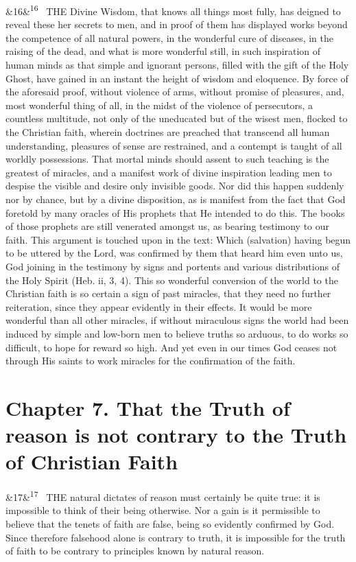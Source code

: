 \documentclass[12pt]{article}
\newcommand{\para}[1][]{\par\noindent\ifx&#1&\else\textsuperscript{\footnotesize #1}~\fi}
\begin{document}
\para[16] THE Divine Wisdom, that knows all things most fully, has deigned to reveal these her secrets to men, and in proof of them has displayed works beyond the competence of all natural powers, in the wonderful cure of diseases, in the raising of the dead, and what is more wonderful still, in such inspiration of human minds as that simple and ignorant persons, filled with the gift of the Holy Ghost, have gained in an instant the height of wisdom and eloquence. By force of the aforesaid proof, without violence of arms, without promise of pleasures, and, most wonderful thing of all, in the midst of the violence of persecutors, a countless multitude, not only of the uneducated but of the wisest men, flocked to the Christian faith, wherein doctrines are preached that transcend all human understanding, pleasures of sense are restrained, and a contempt is taught of all worldly possessions. That mortal minds should assent to such teaching is the greatest of miracles, and a manifest work of divine inspiration leading men to despise the visible and desire only invisible goods. Nor did this happen suddenly nor by chance, but by a divine disposition, as is manifest from the fact that God foretold by many oracles of His prophets that He intended to do this. The books of those prophets are still venerated amongst us, as bearing testimony to our faith. This argument is touched upon in the text: Which (salvation) having begun to be uttered by the Lord, was confirmed by them that heard him even unto us, God joining in the testimony by signs and portents and various distributions of the Holy Spirit (Heb. ii, 3, 4). This so wonderful conversion of the world to the Christian faith is so certain a sign of past miracles, that they need no further reiteration, since they appear evidently in their effects. It would be more wonderful than all other miracles, if without miraculous signs the world had been induced by simple and low-born men to believe truths so arduous, to do works so difficult, to hope for reward so high. And yet even in our times God ceases not through His saints to work miracles for the confirmation of the faith.

\section*{Chapter 7. That the Truth of reason is not contrary to the Truth of Christian Faith}

\para[17] THE natural dictates of reason must certainly be quite true: it is impossible to think of their being otherwise. Nor a gain is it permissible to believe that the tenets of faith are false, being so evidently confirmed by God. Since therefore falsehood alone is contrary to truth, it is impossible for the truth of faith to be contrary to principles known by natural reason.
\end{document}
